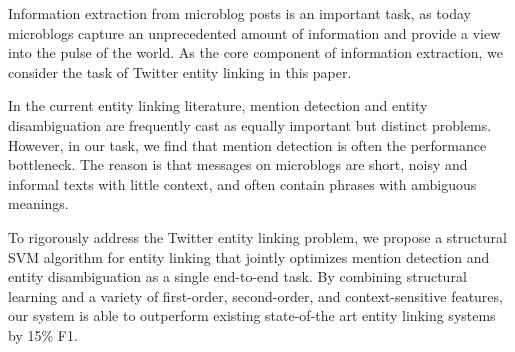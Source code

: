 Information extraction from microblog posts is an important task, as today microblogs capture an unprecedented amount of information and provide a view
 into the pulse of the world. As the core component of information extraction,
 we consider the task of Twitter entity linking in this paper.
 
 In the current entity linking literature, mention detection and entity
 disambiguation are frequently cast as equally important but distinct problems.
 However, in our task, we find that mention detection is often the performance
 bottleneck. The reason is that messages on microblogs are short, noisy and
 informal texts with little context, and often contain phrases with ambiguous
 meanings.
 
 To rigorously address the Twitter entity linking problem, we propose a
 structural SVM algorithm for entity linking that jointly optimizes mention
 detection and entity disambiguation as a single end-to-end task. By combining
 structural learning and a variety of first-order, second-order, and
 context-sensitive features, our system is able to outperform existing
 state-of-the art entity linking systems by 15\% F1.

